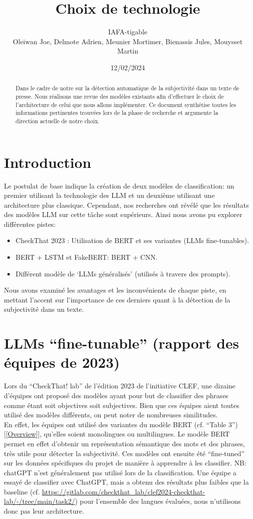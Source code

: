 \documentclass[11pt]{rapport_class}
\title{Choix de technologie}
\author{IAFA-tigable \\ Oleiwan Joe, Delmote Adrien, Meunier Mortimer, Bienassis Jules, Mouysset Martin}
\date{12/02/2024}
\begin{document}
\maketitle

\begin{abstract}
Dans le cadre de notre sur la détection automatique de la subjectivité dans un texte de presse. Nous réalisons une revue des modèles existants afin d’effectuer le choix de l’architecture de celui que nous allons implémenter. Ce document synthétise toutes les informations pertinentes trouvées lors de la phase de recherche et argumente la direction actuelle de notre choix.
\end{abstract}


\tableofcontents

\chapter {Introduction}
\qquad Le postulat de base indique la création de deux modèles de classification: un premier utilisant la technologie des LLM et un deuxième utilisant une architecture plus classique. Cependant, nos recherches ont révélé que les résultats des modèles LLM sur cette tâche sont supérieurs. Ainsi nous avons pu explorer différentes pistes: 
\begin{itemize}
\item CheckThat 2023 : Utilisation de BERT et ses variantes (LLMs fine-tunables).
\item BERT + LSTM et FakeBERT: BERT + CNN.
\item Différent modèle de ‘LLMs généralisés’ (utilisés à travers des prompts).
\end{itemize}
Nous avons examiné les avantages et les inconvénients de chaque piste, en mettant l'accent sur l’importance de ces derniers quant à la détection de la subjectivité dans un texte.


\chapter{LLMs “fine-tunable” (rapport des équipes de 2023)}

\qquad Lors du “CheckThat! lab”  de l’édition 2023 de l’initiative CLEF, une dizaine d’équipes ont proposé des modèles ayant pour but de classifier des phrases comme étant soit objectives soit subjectives. Bien que ces équipes aient toutes utilisé des modèles différents, on peut noter de nombreuses similitudes. \\
En effet, les équipes ont utilisé des variantes du modèle BERT (cf. “Table 3”)[\ref{Overview}], qu'elles soient monolingues ou multilingues. Le modèle BERT permet en effet d’obtenir un représentation sémantique des mots et des phrases, très utile pour détecter la subjectivité.  Ces modèles ont ensuite été “fine-tuned” sur les données spécifiques du projet de manière à apprendre à les classifier.
NB: chatGPT n'est généralement pas utilisé lors de la classification. Une équipe a essayé de classifier avec ChatGPT, mais a obtenu des résultats plus faibles que la baseline (cf. \url{https://gitlab.com/checkthat_lab/clef2024-checkthat-lab/-/tree/main/task2/}) pour l’ensemble des langues évaluées, nous n'utilisons donc pas leur architecture.
\end{document}
